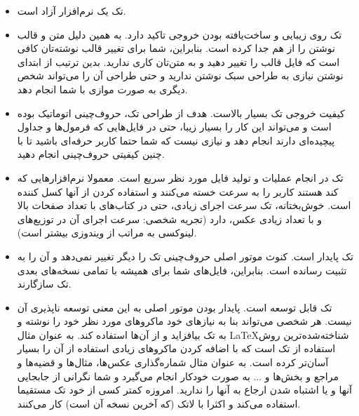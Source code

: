\documentclass[a4paper,12pt]{report}
\begin{document}
\begin{itemize}
\item
تک یک نرم‌افزار آزاد است. 
\item
تک روی زیبایی و ساخت‌یافته بودن خروجی تاکید دارد. به همین دلیل متن و قالب نوشتن را از هم جدا کرده است.
 بنابراین، شما برای تغییر قالب نوشته‌تان کافی است که فایل قالب را تغییر دهید و به متن‌تان کاری ندارید. بدین ترتیب از ابتدای نوشتن نیازی به طراحی سبک نوشتن ندارید و حتی طراحی آن را می‌تواند شخص دیگری به صورت موازی با شما انجام دهد.
\item
کیفیت خروجی تک بسیار بالاست. 
هدف از طراحی تک، حروف‌چینی اتوماتیک بوده است و می‌تواند این کار را بسیار زیبا، حتی در فایل‌هایی که فرمول‌ها و جداول پیچیده‌ای دارند انجام دهد و نیازی نیست که شما حتما کاربر حرفه‌ای باشید تا با چنین کیفیتی حروف‌چینی انجام دهید.

\item
تک در انجام عملیات و تولید فایل مورد نظر  سریع است.
 معمولا نرم‌افزارهایی که کند هستند کاربر را به سرعت خسته می‌کنند و استفاده کردن از آنها کسل کننده است. خوش‌بختانه، تک سرعت اجرای زیادی، حتی در کتاب‌های با تعداد صفحات بالا و با تعداد زیادی عکس، دارد (تجریه شخصی: سرعت اجرای آن در توزیع‌های لینوکسی به مراتب از ویندوزی بیشتر است).

\item
تک پایدار است. کنوث موتور اصلی حروف‌چینی تک را دیگر تغییر نمی‌دهد و آن را به تثبیت رسانده است. بنابراین، فایل‌های شما برای همیشه با تمامی‌ نسخه‌های بعدی تک سازگارند.

\item
تک قابل توسعه است. پایدار بودن موتور اصلی به این معنی توسعه ناپذیری آن نیست.  
هر شخصی ‌می‌تواند بنا به نیاز‌های خود ماکروهای مورد نظر خود را  نوشته و به تک بیافزاید و از آن‌ها استفاده کند.
 به عنوان مثال \LaTeX شناخته‌شده‌ترین روش استفاده از تک است که با اضافه کردن ماکروهای زیادی استفاده از آن را بسیار آسان‌تر کرده است. به عنوان مثال شماره‌گذاری عکس‌ها، مثال‌ها و قضیه‌ها و مراجع  و بخش‌ها و ... به صورت خودکار انجام می‌گیرد و شما نگرانی از جابجایی آنها و یا اشتباه شدن ارجاع به آنها را ندارید. امروزه کمتر کسی از خود تک مستقیما استفاده می‌کند و اکثرا با لاتک (که آخرین نسخه آن \LaTeXe است)‌ کار می‌کنند. 


\end{itemize}
\end{document}
